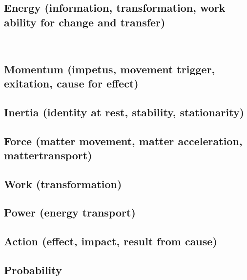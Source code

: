 \subsection{Energy (information, transformation, work ability for change and transfer)} 
 \\

\subsection{Momentum (impetus, movement trigger, exitation, cause for effect)} 
 
\vspace{5ex}
\subsection{Inertia (identity at rest, stability, stationarity) }
 
\vspace{5ex}
\subsection{Force (matter movement, matter acceleration, mattertransport)} 


\vspace{5ex}
\subsection{Work (transformation)} 

\vspace{5ex}
\subsection{Power (energy transport)} 
 
\vspace{5ex}
\subsection{Action (effect, impact, result from cause) } 
 
\vspace{5ex}
\subsection{Probability } 

\vspace{5ex}
